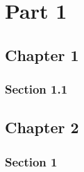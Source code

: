 \documentclass{book}
\begin{document}
\part{Part 1}
\label{part:part-1}


\chapter{Chapter 1}
\label{cha:chapter-1}


\section{Section 1.1}
\label{sec:section-1-1}

\chapter{Chapter 2}
\label{cha:chapter-2}

\section{Section 1}
\label{sec:section-2-1}





\makeatletter
\show\cl@chapter
\makeatother
\end{document}
